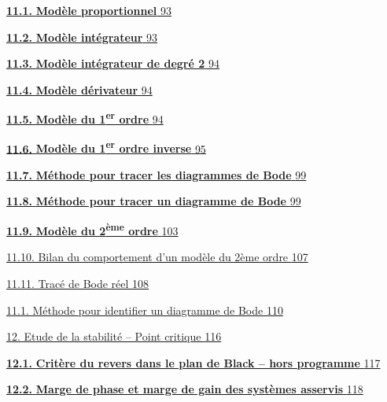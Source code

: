 \protect\hyperlink{_Toc149497283}{\textbf{11.1.} \textbf{Modèle proportionnel} \protect\hyperlink{_Toc149497283}{93}}

\protect\hyperlink{_Toc337686846}{\textbf{11.2.} \textbf{Modèle intégrateur} \protect\hyperlink{_Toc337686846}{93}}

\protect\hyperlink{_Toc149497285}{\textbf{11.3.} \textbf{Modèle intégrateur de degré 2} \protect\hyperlink{_Toc149497285}{94}}

\protect\hyperlink{_Toc149497286}{\textbf{11.4.} \textbf{Modèle dérivateur} \protect\hyperlink{_Toc149497286}{94}}

\protect\hyperlink{_Toc99121126}{\textbf{11.5.} \textbf{Modèle du 1\textsuperscript{er} ordre} \protect\hyperlink{_Toc99121126}{94}}

\protect\hyperlink{_Toc494227268}{\textbf{11.6.} \textbf{Modèle du 1\textsuperscript{er} ordre inverse} \protect\hyperlink{_Toc494227268}{95}}

\protect\hyperlink{_Toc28847704}{\textbf{11.7.} \textbf{Méthode pour tracer les diagrammes de Bode} \protect\hyperlink{_Toc28847704}{99}}

\protect\hyperlink{_Toc99121133}{\textbf{11.8.} \textbf{Méthode pour tracer un diagramme de Bode} \protect\hyperlink{_Toc99121133}{99}}

\protect\hyperlink{_Toc149497291}{\textbf{11.9.} \textbf{Modèle du 2\textsuperscript{ème} ordre} \protect\hyperlink{_Toc149497291}{103}}

\protect\hyperlink{bilan-du-comportement-dun-moduxe8le-du-2uxe8me-ordre}{11.10. Bilan du comportement d'un modèle du 2ème ordre \protect\hyperlink{bilan-du-comportement-dun-moduxe8le-du-2uxe8me-ordre}{107}}

\protect\hyperlink{tracuxe9-de-bode-ruxe9el}{11.11. Tracé de Bode réel \protect\hyperlink{tracuxe9-de-bode-ruxe9el}{108}}

\protect\hyperlink{muxe9thode-pour-identifier-un-diagramme-de-bode}{11.1. Méthode pour identifier un diagramme de Bode \protect\hyperlink{muxe9thode-pour-identifier-un-diagramme-de-bode}{110}}

\protect\hyperlink{etude-de-la-stabilituxe9-point-critique}{12. Etude de la stabilité -- Point critique \protect\hyperlink{etude-de-la-stabilituxe9-point-critique}{116}}

\protect\hyperlink{_Toc59134857}{\textbf{12.1.} \textbf{Critère du revers dans le plan de Black -- hors programme} \protect\hyperlink{_Toc59134857}{117}}

\protect\hyperlink{_Toc59134858}{\textbf{12.2.} \textbf{Marge de phase et marge de gain des systèmes asservis} \protect\hyperlink{_Toc59134858}{118}}

